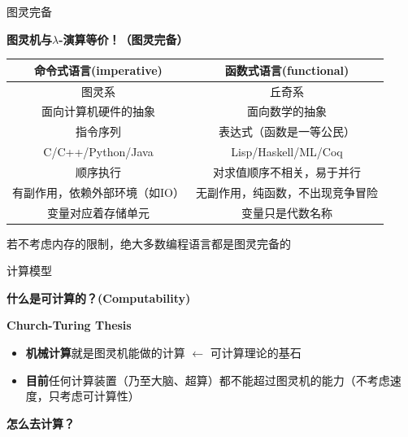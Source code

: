 \documentclass{myslide}
\begin{document}
\begin{frame}{图灵完备}
\begin{center}
\large\textbf{图灵机与$\lambda$-演算等价！（图灵完备）}
\end{center}
\pause
\begin{center}
\fontsm
\begin{tabular}{|c|c|}\hline
命令式语言(imperative) & 函数式语言(functional)\\\hline
图灵系 & 丘奇系 \\\hline
面向计算机硬件的抽象 & 面向数学的抽象\\\hline
指令序列 & 表达式（函数是一等公民）\\\hline
C/C++/Python/Java & Lisp/Haskell/ML/Coq\\\hline
顺序执行 & 对求值顺序不相关，易于并行\\
有副作用，依赖外部环境（如IO） & 无副作用，纯函数，不出现竞争冒险\\
变量对应着存储单元 & 变量只是代数名称\\\hline
\end{tabular}
\end{center}
\pause
若不考虑内存的限制，绝大多数编程语言都是图灵完备的
\end{frame}

\begin{frame}{计算模型}
\begin{center}
\Large\textbf{什么是可计算的？(Computability)}
\end{center}
\pause
\begin{center}
\Large\textbf{Church-Turing Thesis}\\
\end{center}
\begin{itemize}
	\item \textbf{机械计算}就是图灵机能做的计算 $\gets$ 可计算理论的基石 %
	\item \textbf{目前}任何计算装置（乃至大脑、超算）都不能超过图灵机的能力（不考虑速度，只考虑可计算性）
\end{itemize}
\end{frame}

\begin{frame}
\begin{center}
\Large\textbf{怎么去计算？}
\end{center}
\end{frame}
\end{document}
